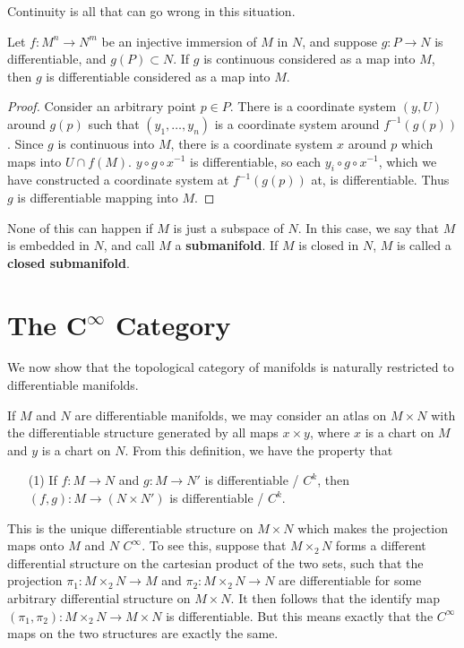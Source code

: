 Continuity is all that can go wrong in this situation.

\begin{theorem}
    Let $f:M^n \to N^m$ be an injective immersion of $M$ in $N$, and suppose $g: P \to N$ is differentiable, and $g(P) \subset N$. If $g$ is continuous considered as a map into $M$, then $g$ is differentiable considered as a map into $M$.
\end{theorem}
\begin{proof}
    Consider an arbitrary point $p \in P$. There is a coordinate system $(y,U)$ around $g(p)$ such that $(y_1, \dots, y_n)$ is a coordinate system around $f^{-1}(g(p))$. Since $g$ is continuous into $M$, there is a coordinate system $x$ around $p$ which maps into $U \cap f(M)$. $y \circ g \circ x^{-1}$ is differentiable, so each $y_i \circ g \circ x^{-1}$, which we have constructed a coordinate system at $f^{-1}(g(p))$ at, is differentiable. Thus $g$ is differentiable mapping into $M$.
\end{proof}

None of this can happen if $M$ is just a subspace of $N$. In this case, we say that $M$ is embedded in $N$, and call $M$ a {\bf submanifold}. If $M$ is closed in $N$, $M$ is called a {\bf closed submanifold}.

\section{The $\mathbf{C^\infty}$ Category}

We now show that the topological category of manifolds is naturally restricted to differentiable manifolds.

\begin{example}
    If $M$ and $N$ are differentiable manifolds, we may consider an atlas on $M \times N$ with the differentiable structure generated by all maps $x \times y$, where $x$ is a chart on $M$ and $y$ is a chart on $N$. From this definition, we have the property that
    \begin{enumerate}
        \item[(1)] If $f:M \to N$ and $g:M \to N'$ is differentiable / $C^k$, then $(f,g) : M \to (N \times N')$ is differentiable / $C^k$.
    \end{enumerate}
    This is the unique differentiable structure on $M \times N$ which makes the projection maps onto $M$ and $N$ $C^\infty$. To see this, suppose that $M \times_2 N$ forms a different differential structure on the cartesian product of the two sets, such that the projection $\pi_1: M \times_2 N \to M$ and $\pi_2: M \times_2 N \to N$ are differentiable for some arbitrary differential structure on $M \times N$. It then follows that the identify map $(\pi_1, \pi_2) : M \times_2 N \to M \times N$ is differentiable. But this means exactly that the $C^\infty$ maps on the two structures are exactly the same.
\end{example}


